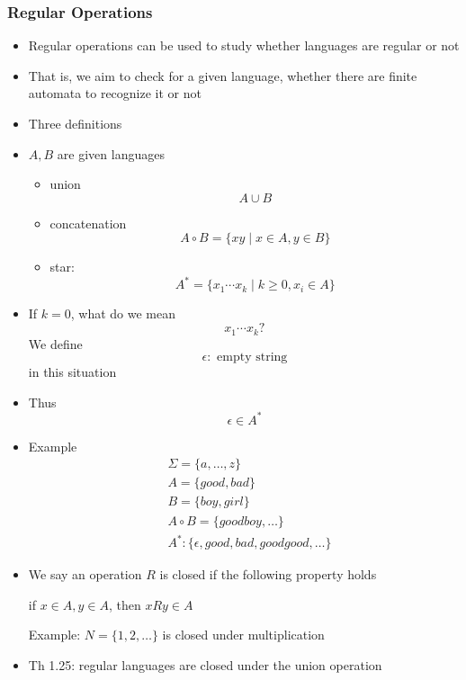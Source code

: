 



\begin{frame}[allowframebreaks] \frametitle{Regular Operations}
  \begin{itemize}
\item Regular operations can be used to study whether languages are regular or not

\item  That is, we aim to check for a given language,
  whether there are finite automata to recognize it or not
\item Three definitions

\item [] $A,B$ are given languages
\begin{itemize}
\item union
  \begin{equation*}
  A \cup B
\end{equation*}
\item concatenation
  \begin{equation*}
  A\circ B=\{xy\mid x\in A, y \in B\}
\end{equation*}
\item star:
  \begin{equation*}
  A^*=\{x_1 \cdots x_k\mid
k \geq 0, x_i \in A\}
\end{equation*}
\end{itemize}
\item If $k=0$, what do we mean
  \begin{equation*}
    x_1 \cdots x_k?
  \end{equation*}
  We define
  \begin{equation*}
     \epsilon: \text{ empty string}
   \end{equation*}
in this situation
\item Thus
  \begin{equation*}
   \epsilon \in A^*
 \end{equation*}
\item Example
  \begin{equation*}
    \begin{split}
& \Sigma =\{a, \ldots, z\}\\
& A=\{good, bad\} \\
& B=\{boy,girl\} \\
& A\circ B=
\{goodboy, \ldots \}\\
& A^*: \{\epsilon, good, bad, goodgood, \ldots\}
\end{split}
\end{equation*}
\item We say an operation $R$ is \alert{closed} if the
  following property holds
  \begin{center}
if $x\in A, y \in A$, then $xRy \in A$
\end{center}
Example: $N=\{1,2,\ldots\}$ is closed under multiplication
\item Th 1.25: regular languages are closed under the union operation


\end{itemize}
\end{frame}
